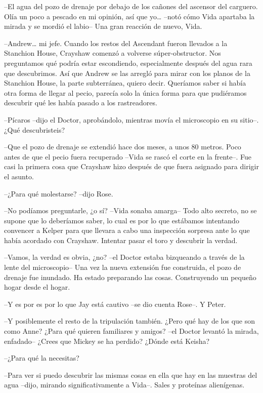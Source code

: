 {--El agua del pozo de drenaje por debajo de los cañones del ascensor
 del carguero. Olía un poco a pescado en mi opinión, así que yo\ldots{}
 --notó cómo Vida apartaba la mirada y se mordió el labio-- Una gran
reacción de nuevo, Vida.}

{--Andrew\ldots{} mi jefe. Cuando los restos del Ascendant fueron
 llevados a la Stanchion House, Crayshaw comenzó a volverse
 súper-obstructor. Nos preguntamos qué podría estar escondiendo,
 especialmente después del agua rara que descubrimos. Así que Andrew se
 las arregló para mirar con los planos de la Stanchion House, la parte
 subterránea, quiero decir. Queríamos saber si había otra forma de llegar
 al pecio, parecía solo la única forma para que pudiéramos descubrir qué
les había pasado a los rastreadores.}

{--Pícaros --dijo el Doctor, aprobándolo, mientras movía el microscopio
en su sitio--. ¿Qué descubristeis?}

{--Que el pozo de drenaje se extendió hace dos meses, a unos 80 metros.
 Poco antes de que el pecio fuera recuperado --Vida se rascó el corte en
 la frente--. Fue casi la primera cosa que Crayshaw hizo después de que
fuera asignado para dirigir el asunto.}

{--¿Para qué molestarse? --dijo Rose.}

{--No podíamos preguntarle, ¿o sí? --Vida sonaba amarga-- Todo alto
 secreto, no se supone que lo deberíamos saber, lo cual es por lo que
 estábamos intentando convencer a Kelper para que llevara a cabo una
 inspección sorpresa ante lo que había acordado con Crayshaw. Intentar
pasar el toro y descubrir la verdad.}

{--Vamos, la verdad es obvia, ¿no? --el Doctor estaba bizqueando a
 través de la lente del microscopio-- Una vez la nueva extensión fue
 construida, el pozo de drenaje fue inundado. Ha estado preparando las
cosas. Construyendo un pequeño hogar desde el hogar.}

{--Y es por es por lo que Jay está cautivo --se dio cuenta Rose--. Y
Peter.}

{--Y posiblemente el resto de la tripulación también. ¿Pero qué hay de
 los que son como Anne? ¿Para qué quieren familiares y amigos? --el
 Doctor levantó la mirada, enfadado-- ¿Crees que Mickey se ha perdido?
¿Dónde está Keisha?}

{--¿Para qué la necesitas?}

{--Para ver si puedo descubrir las mismas cosas en ella que hay en las
 muestras del agua --dijo, mirando significativamente a Vida--. Sales y
proteínas alienígenas.}

